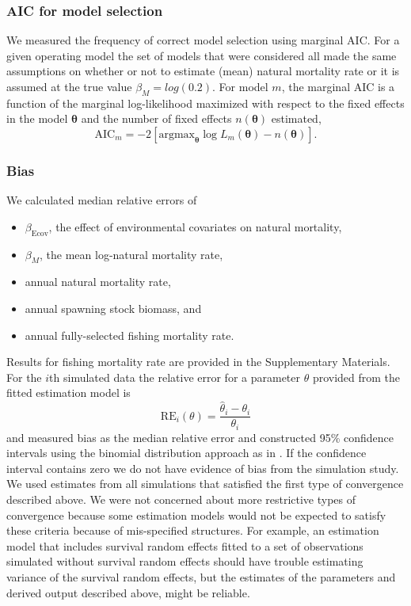 \documentclass[
  12pt,
]{article}
\begin{document}
\hypertarget{aic-for-model-selection}{%
\subsubsection*{AIC for model selection}\label{aic-for-model-selection}}

We measured the frequency of correct model selection using marginal AIC.
For a given operating model the set of models that were considered all
made the same assumptions on whether or not to estimate (mean) natural
mortality rate or it is assumed at the true value
\(\beta_M = log(0.2)\). For model \(m\), the marginal AIC is a function
of the marginal log-likelihood maximized with respect to the fixed
effects in the model \(\boldsymbol{\theta}\) and the number of fixed
effects \(n\left(\boldsymbol{\theta}\right)\) estimated, \[
\text{AIC}_m = -2\left[{\text{argmax}}_{\boldsymbol{\theta}} \log L_m\left({\boldsymbol{\theta}}\right) - n\left({\boldsymbol{\theta}}\right)\right].
\]

\hypertarget{bias}{%
\subsubsection*{Bias}\label{bias}}

We calculated median relative errors of

\begin{itemize}
\item $\beta_\text{Ecov}$, the effect of environmental covariates on natural mortality, 
\item $\beta_M$, the mean log-natural mortality rate,
\item annual natural mortality rate,
\item annual spawning stock biomass, and
\item annual fully-selected fishing mortality rate.
\end{itemize}

Results for fishing mortality rate are provided in the Supplementary
Materials. For the \(i\)th simulated data the relative error for a
parameter \(\theta\) provided from the fitted estimation model is \[
{\text{RE}_i}\left(\theta\right) = \frac{\widehat \theta_i - \theta_i}{\theta_i}
\] and measured bias as the median relative error and constructed 95\%
confidence intervals using the binomial distribution approach as in
\citet{stockmiller21}. If the confidence interval contains zero we do
not have evidence of bias from the simulation study. We used estimates
from all simulations that satisfied the first type of convergence
described above. We were not concerned about more restrictive types of
convergence because some estimation models would not be expected to
satisfy these criteria because of mis-specified structures. For example,
an estimation model that includes survival random effects fitted to a
set of observations simulated without survival random effects should
have trouble estimating variance of the survival random effects, but the
estimates of the parameters and derived output described above, might be
reliable.
\end{document}
